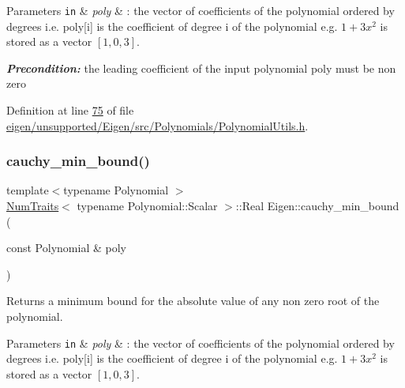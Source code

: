\begin{DoxyParams}[1]{Parameters}
\mbox{\tt in}  & {\em poly} & \+: the vector of coefficients of the polynomial ordered by degrees i.\+e. poly\mbox{[}i\mbox{]} is the coefficient of degree i of the polynomial e.\+g. $ 1 + 3x^2 $ is stored as a vector $ [ 1, 0, 3 ] $.\\
\hline
\end{DoxyParams}
{\itshape {\bfseries Precondition\+:}}  the leading coefficient of the input polynomial poly must be non zero  

Definition at line \hyperlink{eigen_2unsupported_2_eigen_2src_2_polynomials_2_polynomial_utils_8h_source_l00075}{75} of file \hyperlink{eigen_2unsupported_2_eigen_2src_2_polynomials_2_polynomial_utils_8h_source}{eigen/unsupported/\+Eigen/src/\+Polynomials/\+Polynomial\+Utils.\+h}.

\mbox{\label{namespace_eigen_a43f0af310d5cc131eb5e806f241af951}} 
\subsubsection{\texorpdfstring{cauchy\+\_\+min\+\_\+bound()}{cauchy\_min\_bound()}}
{\footnotesize\ttfamily template$<$typename Polynomial $>$ \\
\hyperlink{group___core___module_struct_eigen_1_1_num_traits}{Num\+Traits}$<$ typename Polynomial\+::\+Scalar $>$\+::Real Eigen\+::cauchy\+\_\+min\+\_\+bound (\begin{DoxyParamCaption}\item[{const Polynomial \&}]{poly }\end{DoxyParamCaption})\hspace{0.3cm}{\ttfamily [inline]}}

\begin{DoxyReturn}{Returns}
a minimum bound for the absolute value of any non zero root of the polynomial. 
\end{DoxyReturn}

\begin{DoxyParams}[1]{Parameters}
\mbox{\tt in}  & {\em poly} & \+: the vector of coefficients of the polynomial ordered by degrees i.\+e. poly\mbox{[}i\mbox{]} is the coefficient of degree i of the polynomial e.\+g. $ 1 + 3x^2 $ is stored as a vector $ [ 1, 0, 3 ] $. \\
\hline
\end{DoxyParams}


